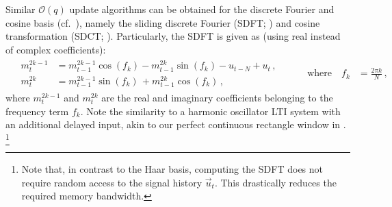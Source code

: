 Similar $\mathcal{O}(q)$ update algorithms can be obtained for the discrete Fourier and cosine basis (cf.~), namely the sliding discrete Fourier (SDFT; \cite{springer1991sliding,jacobsen2003sliding}) and cosine transformation (SDCT; \cite{kober2004fast}).
Particularly, the SDFT is given as (using real instead of complex coefficients):
\begin{align}
	&\begin{aligned}
		m^{2k - 1}_t &= m^{2k -1}_{t - 1} \cos(f_k) - m^{2k}_{t - 1} \sin(f_k) - u_{t - N} + u_{t}\,, \\
		m^{2k}_t &= m^{2k - 1}_{t - 1}    \sin(f_k) \, + m^{2k}_{t - 1} \cos(f_k) \,,
	\end{aligned} & \quad\quad \text{where} \quad f_k &= \frac{2 \pi k}{N} \,,
	\label{eqn:sdft}
\end{align}
where $m_t^{2k - 1}$ and $m_t^{2k}$ are the real and imaginary coefficients belonging to the frequency term $f_k$.
Note the similarity to a harmonic oscillator LTI system with an additional delayed input, akin to our perfect continuous \LTI rectangle window in .%
\footnote{Note that, in contrast to the Haar basis, computing the SDFT does not require random access to the signal history $\vec u_t$. This drastically reduces the required memory bandwidth.}

\newcommand{\symLTI}{\texttt{[image: media/chapters/04\_temporal\_tuning/04\_04/sym\_lti.pdf]}}
\newcommand{\symSDT}{\texttt{[image: media/chapters/04\_temporal\_tuning/04\_04/sym\_sdt.pdf]}}
\newcommand{\symFIR}{\texttt{[image: media/chapters/04\_temporal\_tuning/04\_04/sym\_fir.pdf]}}


